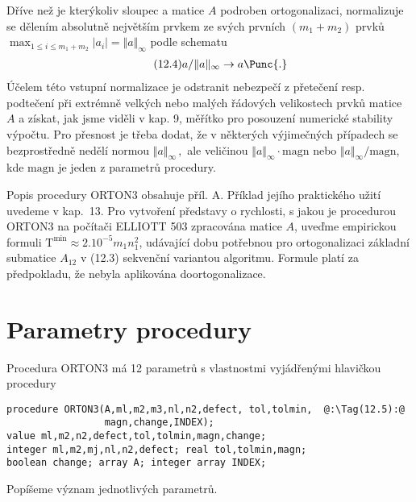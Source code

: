 Dříve než je kterýkoliv sloupec a matice $A$ podroben
ortogonalizaci, normalizuje se dělením absolutně největším prvkem ze
svých prvních $(m_1 + m_2)$ prvků
%
$ { \max_{1 \le i \le m_1+m_2} }| a_i | = \Vert a \Vert_\infty $
%
podle schematu
%
\begin{align*}
  \tag{12.4}
  a / \Vert a \Vert_\infty \rightarrow a \Punc{.}
\end{align*}
%
Účelem této vstupní normalizace je odstranit nebezpečí z
přetečení resp. podtečení při extrémně velkých nebo malých řádových
velikostech prvků matice $A$ a získat, jak jsme viděli v kap. 9,
měřítko pro posouzení numerické stability výpočtu. Pro přesnost
je třeba dodat, že v některých výjimečných případech se
bezprostředně nedělí normou
%
$ \Vert a \Vert_\infty\,,$
%
ale veličinou
%
$ \Vert a \Vert_\infty \cdot \mathrm{magn}$
%
nebo
%
$ \Vert a \Vert_\infty / \mathrm{magn}$,
%
kde $\mathrm{magn}$ je jeden z parametrů procedury.






Popis procedury ORTON3 obsahuje příl. A. Příklad jejího
praktického užití uvedeme v kap.~13. Pro vytvoření představy o
rychlosti, s jakou je procedurou ORTON3 na počítači ELLIOTT 503
zpracována matice $A$, uveďme empirickou formuli
%
$\mathrm{T}^{\min} \approx 2.10^{-5}m_1n_1^2$,
%
udávající dobu potřebnou pro ortogonalizaci základní submatice
$A_{12}$ v (12.3) sekvenční variantou algoritmu. Formule platí za
předpokladu, že nebyla aplikována doortogonalizace.


\section{Parametry procedury}

Procedura ORTON3 má 12 parametrů s vlastnostmi vyjádřenými
hlavičkou procedury

\begin{lstlisting}
procedure ORTON3(A,ml,m2,m3,nl,n2,defect, tol,tolmin,  @:\Tag(12.5):@
                 magn,change,INDEX);
value ml,m2,n2,defect,tol,tolmin,magn,change;
integer ml,m2,mj,nl,n2,defect; real tol,tolmin,magn;
boolean change; array A; integer array INDEX;
\end{lstlisting}

\noindent
Popíšeme význam jednotlivých parametrů.

